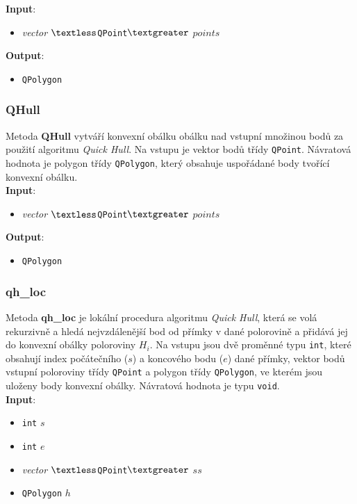 \documentclass[a4paper, 12pt]{article}
\begin{document}
\textbf{Input}:
\begin{itemize}
\item \textsl{vector} $\textless$\texttt{QPoint}$\textgreater$ $points$
\end{itemize}

\textbf{Output}:
\begin{itemize}
\item \texttt{QPolygon}
\end{itemize}

\subsubsection*{QHull}
Metoda \textbf{QHull} vytváří konvexní obálku obálku nad vstupní množinou bodů za použití algoritmu \textit{Quick Hull}. Na vstupu je vektor bodů třídy \texttt{QPoint}. Návratová hodnota je polygon třídy \texttt{QPolygon}, který obsahuje uspořádané body tvořící konvexní obálku.\\

\textbf{Input}:
\begin{itemize}
\item \textsl{vector} $\textless$\texttt{QPoint}$\textgreater$ $points$
\end{itemize}

\textbf{Output}:
\begin{itemize}
\item \texttt{QPolygon}
\end{itemize}

\subsubsection*{qh\_loc}
Metoda \textbf{qh\_loc} je lokální procedura algoritmu \textit{Quick Hull}, která se volá rekurzivně a hledá nejvzdálenější bod od přímky v dané polorovině a přidává jej do konvexní obálky poloroviny $H_i$. Na vstupu jsou dvě proměnné typu \texttt{int}, které obsahují index počátečního ($s$) a koncového bodu ($e$) dané přímky, vektor bodů vstupní poloroviny třídy \texttt{QPoint} a polygon třídy \texttt{QPolygon}, ve kterém jsou uloženy body konvexní obálky. Návratová hodnota je typu \texttt{void}.\\

\textbf{Input}:
\begin{itemize}
\item \texttt{int} $s$
\item \texttt{int} $e$
\item \textsl{vector} $\textless$\texttt{QPoint}$\textgreater$ $ss$
\item \texttt{QPolygon} $h$
\end{itemize}
\end{document}
